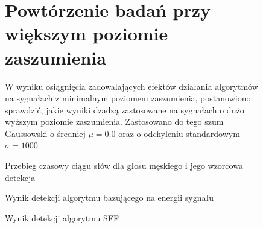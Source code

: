 \documentclass[eng,printmode]{mgr}
\begin{document}
\begin{figure}
\section{Powtórzenie badań przy większym poziomie zaszumienia}
W wyniku osiągnięcia zadowalających efektów działania algorytmów na sygnałach z minimalnym poziomem zaszumienia, postanowiono sprawdzić, jakie wyniki dzadzą zastosowane na sygnałach o dużo wyższym poziomie zaszumienia. Zastosowano do tego szum Gaussowski o średniej $\mu = 0.0$  oraz o odchyleniu standardowym $\sigma=1000$
\end{figure}

\begin{figure}
	\begin{center}
		\caption{Przebieg czasowy ciągu słów dla głosu męskiego i jego wzorcowa detekcja}\vspace{5mm}
		
		\caption{Wynik detekcji algorytmu bazującego na energii sygnału}\vspace{5mm}
		
		\caption{Wynik detekcji algorytmu SFF}\vspace{5mm}
		

\end{center}
\end{figure}
\end{document}

